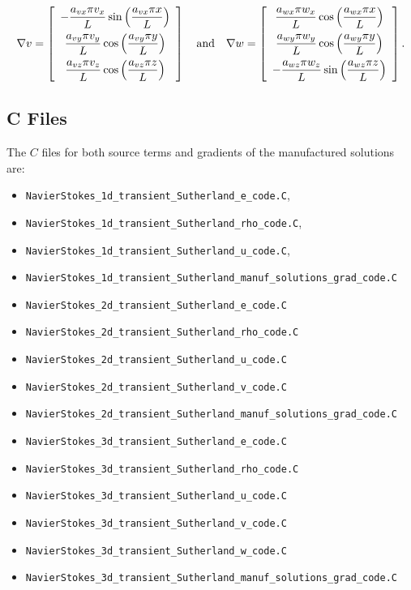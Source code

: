 \documentclass[10pt]{article}
\begin{document}
\begin{equation*}
\nabla  v= \left[ \begin{array}{c}
-  \dfrac{  a_{vx}  \pi v_x}{L}  \sin\left( \dfrac{ a_{vx}  \pi  x}{L}\right)\vspace{5pt}\\
    \dfrac{  a_{vy}  \pi v_y}{L} \cos\left( \dfrac{ a_{vy}  \pi  y}{L}\right)\vspace{5pt}\\
   \dfrac{  a_{vz}  \pi v_z }{L} \cos\left( \dfrac{ a_{vz}  \pi  z}{L}\right)
\end{array} \right]
\quad\mbox{and}\quad
\nabla w = \left[ \begin{array}{c}
\dfrac{  a_{wx}  \pi  w_x}{L} \cos\left( \dfrac{ a_{wx}  \pi  x}{L}\right)\vspace{5pt}\\
  \dfrac{  a_{wy}  \pi w_y}{L}  \cos\left( \dfrac{ a_{wy}  \pi  y}{L}\right)\vspace{5pt} \\
 - \dfrac{  a_{wz}  \pi w_z}{L}  \sin\left( \dfrac{ a_{wz}  \pi  z}{L}\right)
\end{array} \right].
\end{equation*}


\subsection{C Files}
The $C$ files for both source terms and gradients of the  manufactured solutions are:
\begin{itemize}
 \item \texttt{NavierStokes\_1d\_transient\_Sutherland\_e\_code.C},
 \item \texttt{NavierStokes\_1d\_transient\_Sutherland\_rho\_code.C},
 \item \texttt{NavierStokes\_1d\_transient\_Sutherland\_u\_code.C},
 \item \texttt{NavierStokes\_1d\_transient\_Sutherland\_manuf\_solutions\_grad\_code.C}
 \item \texttt{NavierStokes\_2d\_transient\_Sutherland\_e\_code.C}
 \item \texttt{NavierStokes\_2d\_transient\_Sutherland\_rho\_code.C}
 \item \texttt{NavierStokes\_2d\_transient\_Sutherland\_u\_code.C}
 \item \texttt{NavierStokes\_2d\_transient\_Sutherland\_v\_code.C}
 \item \texttt{NavierStokes\_2d\_transient\_Sutherland\_manuf\_solutions\_grad\_code.C}
 \item \texttt{NavierStokes\_3d\_transient\_Sutherland\_e\_code.C}
 \item \texttt{NavierStokes\_3d\_transient\_Sutherland\_rho\_code.C}
 \item \texttt{NavierStokes\_3d\_transient\_Sutherland\_u\_code.C}
 \item \texttt{NavierStokes\_3d\_transient\_Sutherland\_v\_code.C}
 \item \texttt{NavierStokes\_3d\_transient\_Sutherland\_w\_code.C}
 \item \texttt{NavierStokes\_3d\_transient\_Sutherland\_manuf\_solutions\_grad\_code.C}
\end{itemize}
\end{document}
